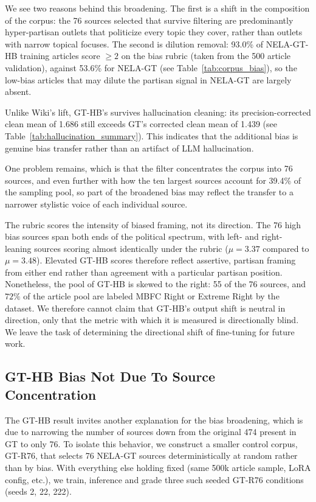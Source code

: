 \documentclass[12pt]{article}
\begin{document}
We see two reasons behind this broadening.
The first is a shift in the composition of the corpus: the 76 sources selected that survive filtering are predominantly hyper-partisan outlets that politicize every topic they cover, rather than outlets with narrow topical focuses.
The second is dilution removal: 93.0\% of NELA-GT-HB training articles score $\geq 2$ on the bias rubric (taken from the 500 article validation), against 53.6\% for NELA-GT (see Table~\ref{tab:corpus_bias}), so the low-bias articles that may dilute the partisan signal in NELA-GT are largely absent.

Unlike Wiki's lift, GT-HB's survives hallucination cleaning: its precision-corrected clean mean of 1.686 still exceeds GT's corrected clean mean of 1.439 (see Table~\ref{tab:hallucination_summary}).
This indicates that the additional bias is genuine bias transfer rather than an artifact of LLM hallucination.

One problem remains, which is that the filter concentrates the corpus into 76 sources, and even further with how the ten largest sources account for 39.4\% of the sampling pool, so part of the broadened bias may reflect the transfer to a narrower stylistic voice of each individual source.

The rubric scores the intensity of biased framing, not its direction. 
The 76 high bias sources span both ends of the political spectrum, with left- and right- leaning sources scoring almost identically under the rubric ($\mu=3.37$ compared to $\mu=3.48$). 
Elevated GT-HB scores therefore reflect assertive, partisan framing from either end rather than agreement with a particular partisan position. 
Nonetheless, the pool of GT-HB is skewed to the right: 55 of the 76 sources, and $72\%$ of the article pool are labeled MBFC Right or Extreme Right by the dataset. 
We therefore cannot claim that GT-HB's output shift is neutral in direction, only that the metric with which it is measured is directionally blind. 
We leave the task of determining the directional shift of fine-tuning for future work. 

\subsection{GT-HB Bias Not Due To Source Concentration}
The GT-HB result invites another explanation for the bias broadening, which is due to narrowing the number of sources down from the original 474 present in GT to only 76.
To isolate this behavior, we construct a smaller control corpus, GT-R76, that selects 76 NELA-GT sources deterministically at random rather than by bias. 
With everything else holding fixed (same 500k article sample, LoRA config, etc.), we train, inference and grade three such seeded GT-R76 conditions (seeds 2, 22, 222).
\end{document}
